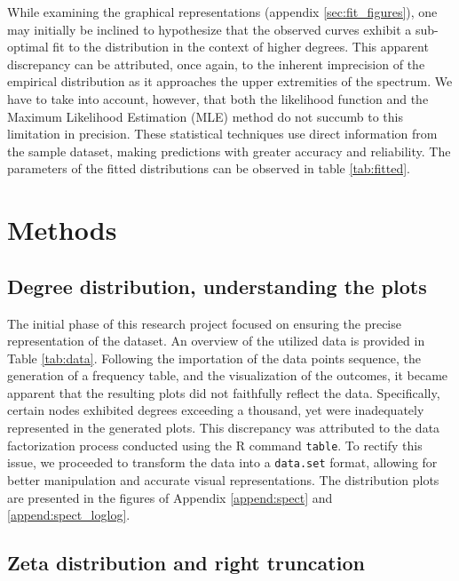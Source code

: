 \documentclass{article}
\begin{document}
While examining the graphical representations (appendix \ref{sec:fit_figures}), one may initially be inclined to hypothesize that the observed curves exhibit a sub-optimal fit to the distribution in the context of higher degrees. This apparent discrepancy can be attributed, once again, to the inherent imprecision of the empirical distribution as it approaches the upper extremities of the spectrum. We have to take into account, however, that both the likelihood function and the Maximum Likelihood Estimation (MLE) method do not succumb to this limitation in precision. These statistical techniques use direct information from the sample dataset, making predictions with greater accuracy and reliability. The parameters of the fitted  distributions can be observed in table \ref{tab:fitted}.



\section{Methods}

\subsection*{Degree distribution, understanding the plots}

The initial phase of this research project focused on ensuring the precise representation of the dataset. An overview of the utilized data is provided in Table \ref{tab:data}. Following the importation of the data points sequence, the generation of a frequency table, and the visualization of the outcomes, it became apparent that the resulting plots did not faithfully reflect the data. Specifically, certain nodes exhibited degrees exceeding a thousand, yet were inadequately represented in the generated plots. This discrepancy was attributed to the data factorization process conducted using the R command \verb|table|. To rectify this issue, we proceeded to transform the data into a \verb|data.set| format, allowing for better manipulation and accurate visual representations. The distribution plots are presented in the figures of Appendix \ref{append:spect} and \ref{append:spect_loglog}.



\subsection*{Zeta distribution and right truncation}
\end{document}
